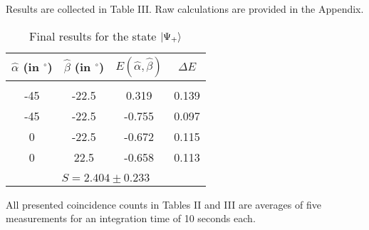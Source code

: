 \documentclass[aps,prl,nofootinbib,twocolumn,superscriptaddress,groupedaddress]{revtex4}  %
\begin{document}
Results are collected in Table III. Raw calculations are provided in the Appendix.
\begin{table}[H]
\centering
\begin{tabular}{|c|c|c|c|}
\hline
$\hat{\alpha}$ (in $^{\circ}$) & $\hat{\beta}$ (in $^{\circ}$) & $E(\hat{\alpha},\hat{\beta})$ & $\Delta E$\\
\hline
\multicolumn{4}{|c|}{}\\[-2mm]
-45 & -22.5 & 0.319 & 0.139\\
-45 & -22.5 & -0.755 & 0.097\\
0 & -22.5 & -0.672 & 0.115\\
0 & 22.5 & -0.658 & 0.113 \\
\hline
\multicolumn{4}{|c|}{}\\[-2mm]
\multicolumn{4}{|c|}{$ S = 2.404 \pm 0.233 $}\\
\hline
\end{tabular}
\caption{Final results for the state $\ket{\Psi_{+}}$}
\end{table}
All presented coincidence counts in Tables II and III are averages of five measurements for an integration time of 10 seconds each.
\end{document}
